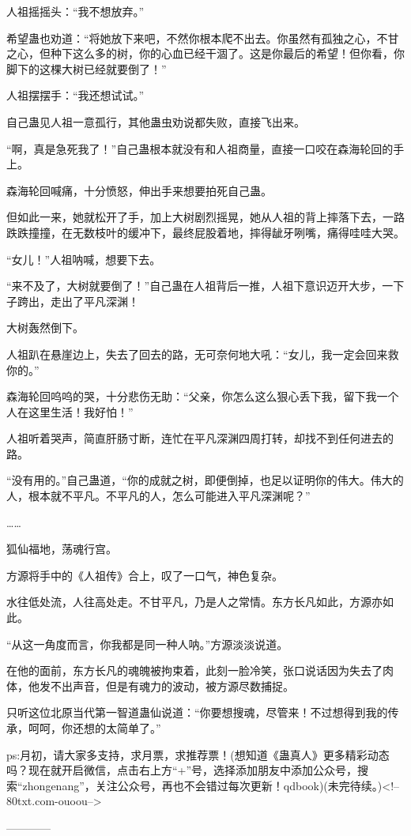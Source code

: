 \begin{this_body}
人祖摇摇头：“我不想放弃。”

希望蛊也劝道：“将她放下来吧，不然你根本爬不出去。你虽然有孤独之心，不甘之心，但种下这么多的树，你的心血已经干涸了。这是你最后的希望！但你看，你脚下的这棵大树已经就要倒了！”

人祖摆摆手：“我还想试试。”

自己蛊见人祖一意孤行，其他蛊虫劝说都失败，直接飞出来。

“啊，真是急死我了！”自己蛊根本就没有和人祖商量，直接一口咬在森海轮回的手上。

森海轮回喊痛，十分愤怒，伸出手来想要拍死自己蛊。

但如此一来，她就松开了手，加上大树剧烈摇晃，她从人祖的背上摔落下去，一路跌跌撞撞，在无数枝叶的缓冲下，最终屁股着地，摔得龇牙咧嘴，痛得哇哇大哭。

“女儿！”人祖呐喊，想要下去。

“来不及了，大树就要倒了！”自己蛊在人祖背后一推，人祖下意识迈开大步，一下子跨出，走出了平凡深渊！

大树轰然倒下。

人祖趴在悬崖边上，失去了回去的路，无可奈何地大吼：“女儿，我一定会回来救你的。”

森海轮回呜呜的哭，十分悲伤无助：“父亲，你怎么这么狠心丢下我，留下我一个人在这里生活！我好怕！”

人祖听着哭声，简直肝肠寸断，连忙在平凡深渊四周打转，却找不到任何进去的路。

“没有用的。”自己蛊道，“你的成就之树，即便倒掉，也足以证明你的伟大。伟大的人，根本就不平凡。不平凡的人，怎么可能进入平凡深渊呢？”

……

狐仙福地，荡魂行宫。

方源将手中的《人祖传》合上，叹了一口气，神色复杂。

水往低处流，人往高处走。不甘平凡，乃是人之常情。东方长凡如此，方源亦如此。

“从这一角度而言，你我都是同一种人呐。”方源淡淡说道。

在他的面前，东方长凡的魂魄被拘束着，此刻一脸冷笑，张口说话因为失去了肉体，他发不出声音，但是有魂力的波动，被方源尽数捕捉。

只听这位北原当代第一智道蛊仙说道：“你要想搜魂，尽管来！不过想得到我的传承，呵呵，你还想的太简单了。”

ps:月初，请大家多支持，求月票，求推荐票！(想知道《蛊真人》更多精彩动态吗？现在就开启微信，点击右上方“+”号，选择添加朋友中添加公众号，搜索“zhongenang”，关注公众号，再也不会错过每次更新！qdbook)(未完待续。)<!--80txt.com-ouoou-->

------------

\end{this_body}

